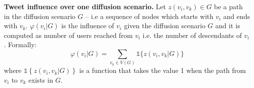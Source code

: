 \textbf{Tweet influence over one diffusion scenario.}
%
Let $z(v_i, v_k) \in G$ be a path in the diffusion scenario $G$ -- i.e a sequence of nodes which starts with $v_i$ and ends with $v_k$.
$\varphi(v_i | G)$ is the influence of $v_i$ given the diffusion scenario $G$ and it is computed as number of users reached from $v_i$ i.e. the number of descendants of $v_i$.
Formally:
%
\begin{equation}
	\varphi(v_i|G) 	=  \sum_{v_k \in V(G)} \mathds{1} \{z(v_i,v_k | G) \} \label{eq:infl-in-a-scenario}
\end{equation}
where $\mathds{1} \left\lbrace z(v_i,v_k|G) \right\rbrace$ is a function that takes the value 1 when the path from $v_i$ to $v_k$ exists in $G$.

